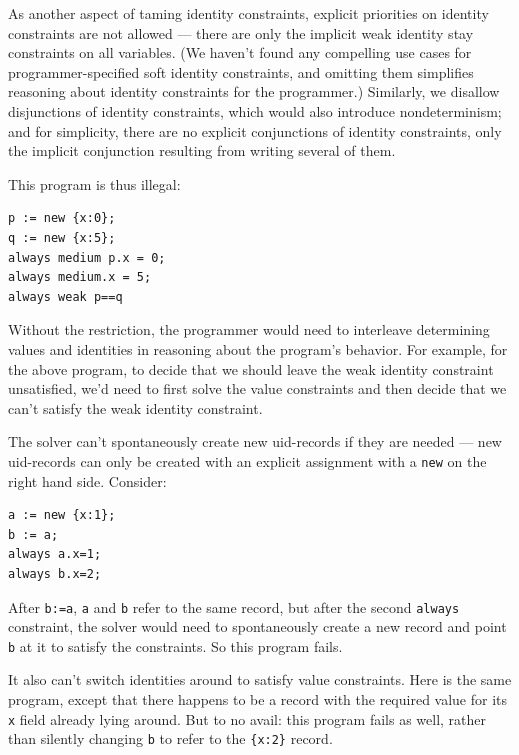 \documentclass{article}
\def\ab#1{\textcolor{red}{\textsf{AB: #1}}}
\begin{document}

As another aspect of taming identity constraints, explicit priorities
on identity constraints are not allowed --- there are only the
implicit weak identity stay constraints on all variables.  (We haven't
found any compelling use cases for programmer-specified soft identity
constraints, and omitting them simplifies reasoning about identity
constraints for the programmer.)  Similarly, we disallow disjunctions
of identity constraints, which would also introduce nondeterminism;
and for simplicity, there are no explicit conjunctions of identity
constraints, only the implicit conjunction resulting from writing
several of them.

This program is thus illegal:

\begin{verbatim}
p := new {x:0};
q := new {x:5};
always medium p.x = 0;
always medium.x = 5;
always weak p==q
\end{verbatim}

Without the restriction, the programmer would need to interleave
determining values and identities in reasoning about the program's
behavior.  For example, for the above program, to decide that we
should leave the weak identity constraint unsatisfied, we'd need to
first solve the value constraints and then decide that we can't
satisfy the weak identity constraint.

The solver can't spontaneously create new uid-records if they are needed
--- new uid-records can only be created with an explicit assignment with a
\verb|new| on the right hand side.  Consider:

\begin{verbatim}
a := new {x:1};
b := a;
always a.x=1;
always b.x=2;
\end{verbatim}

After \verb|b:=a|, {\tt a} and {\tt b} refer to the same record, but
after the second {\tt always} constraint, the solver would need to
spontaneously create a new record and point {\tt b} at it to satisfy
the constraints.  So this program fails.

It also can't switch identities around to satisfy value constraints.
Here is the same program, except that there happens to be a record
with the required value for its \verb|x| field already lying around.
But to no avail: this program fails as well, rather than silently
changing \verb|b| to refer to the \verb|{x:2}| record.
\end{document}
